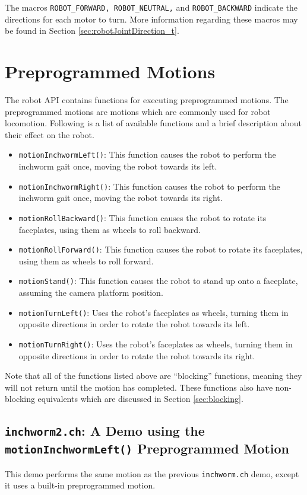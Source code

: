 \documentclass{article}
\begin{document}
The macros \texttt{ROBOT\_FORWARD, ROBOT\_NEUTRAL,} and \texttt{ROBOT\_BACKWARD}
indicate the directions for each motor to turn. More information regarding these
macros may be found in Section \ref{sec:robotJointDirection_t}.

\section{Preprogrammed Motions}
The robot API contains functions for executing preprogrammed motions. The 
preprogrammed motions are motions which are commonly used for robot locomotion.
Following is a list of available functions and a brief description about
their effect on the robot.
\begin{itemize}
\item \texttt{motionInchwormLeft()}: This function causes the robot to perform
  the inchworm gait once, moving the robot towards its left.
\item \texttt{motionInchwormRight()}: This function causes the robot to perform
  the inchworm gait once, moving the robot towards its right.
\item \texttt{motionRollBackward()}: This function causes the robot to rotate
  its faceplates, using them as wheels to roll backward.
\item \texttt{motionRollForward()}: This function causes the robot to rotate
  its faceplates, using them as wheels to roll forward.
\item \texttt{motionStand()}: This function causes the robot to stand up onto a 
  faceplate, assuming the camera platform position.
\item \texttt{motionTurnLeft()}: Uses the robot's faceplates as wheels, turning
  them in opposite directions in order to rotate the robot towards its left.
\item \texttt{motionTurnRight()}: Uses the robot's faceplates as wheels, turning
  them in opposite directions in order to rotate the robot towards its right.
\end{itemize}

Note that all of the functions listed above are ``blocking'' functions, meaning
they will not return until the motion has completed. These functions also
have non-blocking equivalents which are discussed in Section
\ref{sec:blocking}.

\subsection{\texttt{inchworm2.ch}: A Demo using the \texttt{motionInchwormLeft()}
Preprogrammed Motion}
This demo performs the same motion as the previous \texttt{inchworm.ch} demo,
except it uses a built-in preprogrammed motion.
\end{document}
